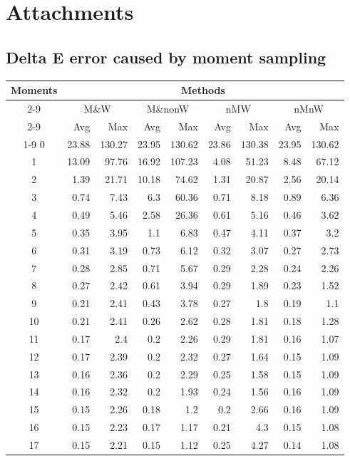 \chapter{Attachments}

\section{Delta E error caused by moment sampling} \label{sec:completeMomentError}

\begin{table}[h]
	\centering
	\begin{tabular}{crrrrrrrr}
		\toprule
		\multirow{4}{*}{Moments} &
		\multicolumn{8}{c}{Methods} \\
		\cmidrule(lr){2-9}
		&\multicolumn{2}{c}{M\&W} &
		\multicolumn{2}{c}{M\&nonW} &
		\multicolumn{2}{c}{nMW} &
		\multicolumn{2}{c}{nMnW}\\
		\cmidrule(lr){2-9}
		& Avg & Max & Avg & Max & Avg & Max & Avg & Max \\
		\cmidrule(lr){1-9}
		0&23.88&130.27&23.95&130.62&23.86&130.38&23.95&130.62\\
		1&13.09&97.76&16.92&107.23&4.08&51.23&8.48&67.12\\
		2&1.39&21.71&10.18&74.62&1.31&20.87&2.56&20.14\\
		3&0.74&7.43&6.3&60.36&0.71&8.18&0.89&6.36\\
		4&0.49&5.46&2.58&26.36&0.61&5.16&0.46&3.62\\
		5&0.35&3.95&1.1&6.83&0.47&4.11&0.37&3.2\\
		6&0.31&3.19&0.73&6.12&0.32&3.07&0.27&2.73\\
		7&0.28&2.85&0.71&5.67&0.29&2.28&0.24&2.26\\
		8&0.27&2.42&0.61&3.94&0.29&1.89&0.23&1.52\\
		9&0.21&2.41&0.43&3.78&0.27&1.8&0.19&1.1\\
		10&0.21&2.41&0.26&2.62&0.28&1.81&0.18&1.28\\
		11&0.17&2.4&0.2&2.26&0.29&1.81&0.16&1.07\\
		12&0.17&2.39&0.2&2.32&0.27&1.64&0.15&1.09\\
		13&0.16&2.36&0.2&2.29&0.25&1.58&0.15&1.09\\
		14&0.16&2.32&0.2&1.93&0.24&1.56&0.16&1.09\\
		15&0.15&2.26&0.18&1.2&0.2&2.66&0.16&1.09\\
		16&0.15&2.23&0.17&1.17&0.21&4.3&0.15&1.08\\
		17&0.15&2.21&0.15&1.12&0.25&4.27&0.14&1.08\\

\end{tabular}
\end{table}

